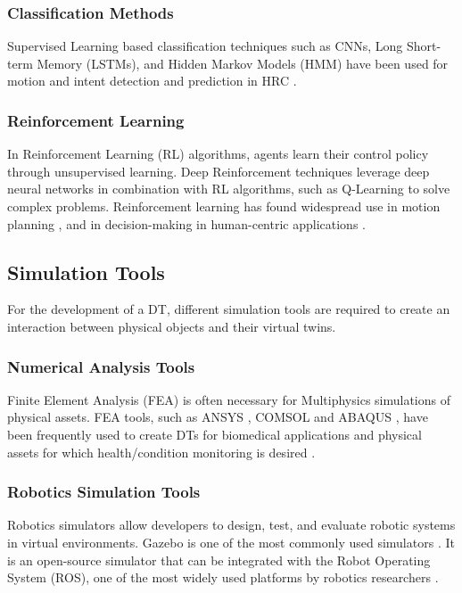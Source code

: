 \subsubsection{Classification Methods}
Supervised Learning based classification techniques such as CNNs, Long Short-term Memory (LSTMs), and Hidden Markov Models (HMM) have been used for motion and intent detection and prediction in HRC \cite{Zhang2022-Fusion, AI-MP-Manu, AI-DT-Survey}.

\subsubsection{Reinforcement Learning}
In Reinforcement Learning (RL) algorithms, agents learn their control policy through unsupervised learning. Deep Reinforcement techniques leverage deep neural networks in combination with RL algorithms, such as Q-Learning to solve complex problems. Reinforcement learning has found widespread use in motion planning \cite{Liu2022, Vrabic2021}, and in decision-making in human-centric applications \cite{Sun2022, Xia2021, Matulis2021}.

\subsection{Simulation Tools}
For the development of a DT, different simulation tools are required to create an interaction between physical objects and their virtual twins.

\subsubsection{Numerical Analysis Tools}
Finite Element Analysis (FEA) is often necessary for Multiphysics simulations of physical assets. FEA tools, such as ANSYS \cite{Aubert2021}, COMSOL \cite{Zhu2022} and ABAQUS \cite{Liang2018}, have been frequently used to create DTs for biomedical applications and physical assets for which health/condition monitoring is desired \cite{Aivaliotis2019}.

\subsubsection{Robotics Simulation Tools}
Robotics simulators allow developers to design, test, and evaluate robotic systems in virtual environments. Gazebo is one of the most commonly used simulators \cite{Thumm2022, Bansal2019, Vrabic2021}. It is an open-source simulator that can be integrated with the Robot Operating System (ROS), one of the most widely used platforms by robotics researchers \cite{Macenski2022}.

